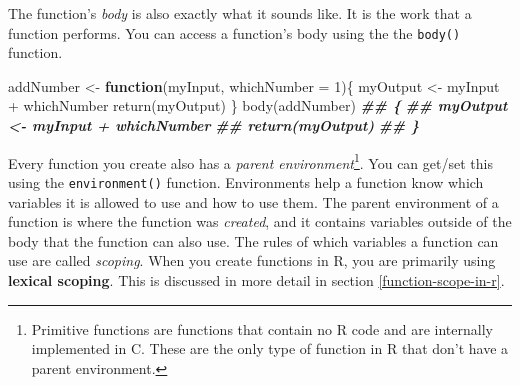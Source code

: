 \documentclass[
  12pt,
  krantz2]{krantz}
\makeatletter
\newenvironment{Shaded}{\begin{snugshade}}{\end{snugshade}}
\newcommand{\AttributeTok}[1]{\textcolor[rgb]{0.61,0.61,0.61}{#1}}
\newcommand{\CommentTok}[1]{\textcolor[rgb]{0.37,0.37,0.37}{\textit{#1}}}
\newcommand{\ControlFlowTok}[1]{\textcolor[rgb]{0.27,0.27,0.27}{\textbf{#1}}}
\newcommand{\DecValTok}[1]{\textcolor[rgb]{0.06,0.06,0.06}{#1}}
\newcommand{\DocumentationTok}[1]{\textcolor[rgb]{0.37,0.37,0.37}{\textbf{\textit{#1}}}}
\newcommand{\FunctionTok}[1]{\textcolor[rgb]{0,0,0}{#1}}
\newcommand{\NormalTok}[1]{#1}
\newcommand{\OtherTok}[1]{\textcolor[rgb]{0.37,0.37,0.37}{#1}}
\newcommand{\SpecialCharTok}[1]{\textcolor[rgb]{0,0,0}{#1}}
\newenvironment{kframe}{%
\medskip{}
\setlength{\fboxsep}{.8em}
 \def\at@end@of@kframe{}%
 \ifinner\ifhmode%
  \def\at@end@of@kframe{\end{minipage}}%
  \begin{minipage}{\columnwidth}%
 \fi\fi%
 \def\FrameCommand##1{\hskip\@totalleftmargin \hskip-\fboxsep
 \colorbox{shadecolor}{##1}\hskip-\fboxsep
     \hskip-\linewidth \hskip-\@totalleftmargin \hskip\columnwidth}%
 \MakeFramed {\advance\hsize-\width
   \@totalleftmargin\z@ \linewidth\hsize
   \@setminipage}}%
 {\par\unskip\endMakeFramed%
 \at@end@of@kframe}
\renewenvironment{Shaded}{\begin{kframe}}{\end{kframe}}
\makeatother
\begin{document}
\begin{Shaded}
\end{Shaded}

The function's \emph{body} is also exactly what it sounds like. It is the work that a function performs. You can access a function's body using the the \texttt{body()} function.

\begin{Shaded}
\begin{Highlighting}[]
\NormalTok{addNumber }\OtherTok{\textless{}{-}} \ControlFlowTok{function}\NormalTok{(myInput, }\AttributeTok{whichNumber =} \DecValTok{1}\NormalTok{)\{  }
\NormalTok{  myOutput }\OtherTok{\textless{}{-}}\NormalTok{ myInput }\SpecialCharTok{+}\NormalTok{ whichNumber}
  \FunctionTok{return}\NormalTok{(myOutput)}
\NormalTok{\}}
\FunctionTok{body}\NormalTok{(addNumber)}
\DocumentationTok{\#\# \{}
\DocumentationTok{\#\#     myOutput \textless{}{-} myInput + whichNumber}
\DocumentationTok{\#\#     return(myOutput)}
\DocumentationTok{\#\# \}}
\end{Highlighting}
\end{Shaded}

Every function you create also has a \emph{parent environment}\footnote{Primitive functions are functions that contain no R code and are internally implemented in C. These are the only type of function in R that don't have a parent environment.}. You can get/set this using the \texttt{environment()} function. Environments help a function know which variables it is allowed to use and how to use them. The parent environment of a function is where the function was \emph{created}, and it contains variables outside of the body that the function can also use. The rules of which variables a function can use are called \emph{scoping}. When you create functions in R, you are primarily using \textbf{lexical scoping}. This is discussed in more detail in section \ref{function-scope-in-r}.
\end{document}
